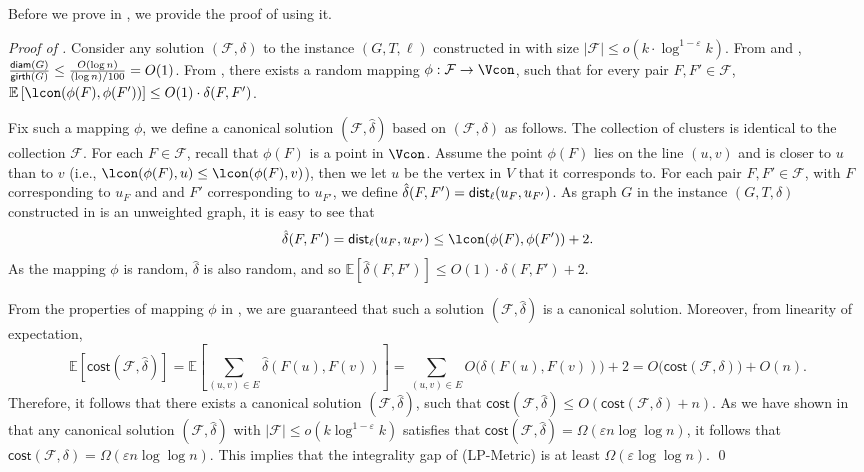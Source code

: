 \documentclass[11pt]{article}
\theoremstyle{definition}
\newcommand{\fset}{{\mathcal{F}}}
\newcommand{\eps}{{\varepsilon}}
\newcommand{\diam}{\textnormal{\textsf{diam}}}
\newcommand{\dist}{\textnormal{\textsf{dist}}}
\newcommand{\gir}{\textnormal{\textsf{girth}}}
\newcommand\vol{\mathsf{cost}}
\def\ex#1{{\mathbb{E}}\left[ #1 \right]}
\begin{document}
Before we prove  in , we provide the proof of  using it.

\emph{Proof of .}
Consider any solution $(\fset,\delta)$ to the instance $(G,T,\ell)$ constructed in  with size $|\fset|\le o(k\cdot \log^{1-\eps}k)$. 
From  and , $\frac{\diam(G)}{\gir(G)}\le \frac{O(\log n)}{(\log n)/100}=O(1)$. From , there exists a random mapping $\phi: \fset \to \Vcon$, such that for every pair $F,F'\in \fset$,
$\ex{\lcon(\phi(F),\phi(F'))} \le O(1)\cdot  \delta(F,F')$. 

Fix such a mapping $\phi$, we define a canonical solution $(\fset,\hat \delta)$ based on $(\fset,\delta)$ as follows. The collection of clusters is identical to the collection $\fset$. For each $F\in \fset$, recall that $\phi(F)$ is a point in $\Vcon$. Assume the point $\phi(F)$ lies on the line $(u,v)$ and is closer to $u$ than to $v$ (i.e., $\lcon(\phi(F),u)\le\lcon(\phi(F),v)$), then we let $u$ be the vertex in $V$ that it corresponds to. For each pair $F,F'\in \fset$, with $F$ corresponding to $u_F$ and and $F'$ corresponding to $u_{F'}$, we define $\hat\delta(F,F')=\dist_{\ell}(u_F,u_{F'})$. 
As graph $G$ in the instance $(G,T,\delta)$ constructed in  is an unweighted graph, it is easy to see that
\[\hat\delta(F,F')=\dist_{\ell}(u_F,u_{F'})\le \lcon(\phi(F),\phi(F'))+2.\]
As the mapping $\phi$ is random, $\hat{\delta}$ is also random, and so $\ex{\hat\delta(F,F')}\le O(1)\cdot  \delta(F,F') +2$.

From the properties of mapping $\phi$ in , we are guaranteed that such a solution $(\fset,\hat\delta)$ is a canonical solution. Moreover, from linearity of expectation, 
$$\ex{\vol(\fset,\hat\delta)}
=\ex{\sum_{(u,v)\in E}\hat\delta(F(u),F(v))}
=\sum_{(u,v)\in E}O\bigg(\delta(F(u),F(v))\bigg)+2
=O\bigg(\vol(\fset,\delta)\bigg)+O(n).
$$
Therefore, it follows that there exists a canonical solution $(\fset,\hat\delta)$, such that $\vol(\fset,\hat\delta)\le O(\vol(\fset,\delta)+n)$.
As we have shown in  that any canonical solution $(\fset,\hat\delta)$ with $|\fset|\le o(k\log^{1-\eps}k)$ satisfies that $\vol(\fset,\hat\delta)=\Omega(\eps n\log\log n)$, it follows that $\vol(\fset,\delta)=\Omega(\eps n\log\log n)$.
This implies that the integrality gap of (\textsf{LP-Metric}) is at least $\Omega(\eps \log\log n)$.
\qed
\end{document}
